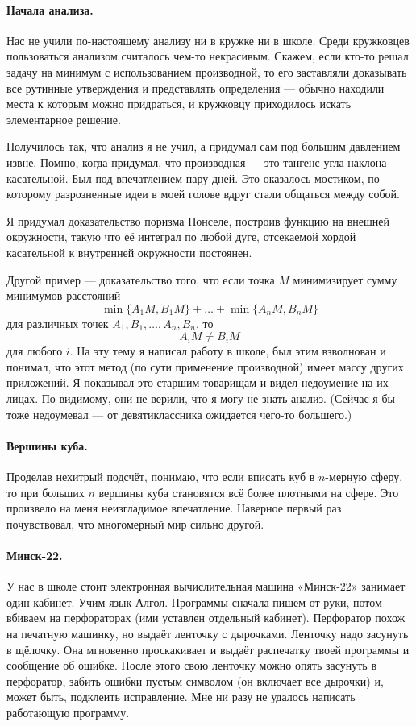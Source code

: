 \documentclass{book}
\begin{document}
\paragraph{Начала анализа.}
Нас не учили по-настоящему анализу ни в кружке ни в школе.
Среди кружковцев пользоваться анализом считалось чем-то некрасивым.
Скажем, если кто-то решал задачу на минимум с использованием производной, то его заставляли доказывать все рутинные утверждения и представлять определения ---
обычно находили места к которым можно придраться, и кружковцу приходилось искать элементарное решение.

Получилось так, что анализ я не учил,
а придумал сам под большим давлением извне.
Помню, когда придумал, что производная --- это тангенс угла наклона касательной.
Был под впечатлением пару дней.
Это оказалось мостиком, по которому разрозненные идеи в моей голове вдруг стали общаться между собой.

Я придумал доказательство поризма Понселе, построив функцию на внешней окружности, такую что её интеграл по любой дуге, отсекаемой хордой касательной к внутренней окружности постоянен.

Другой пример --- доказательство того,
что если точка $M$ минимизирует сумму минимумов расстояний
\[\min\{A_1M,B_1M\}+\dots+\min\{A_nM,B_nM\}\]
для различных точек $A_1,B_1,\dots,A_n,B_n$, 
то
\[A_iM\ne B_iM\]
для любого $i$.
На эту тему я написал работу в школе, 
был этим взволнован и понимал, 
что этот метод (по сути применение производной) имеет массу других приложений.
Я показывал это старшим товарищам и видел недоумение на их лицах.
По-видимому, они не верили, что я могу не знать анализ.
(Сейчас я бы тоже недоумевал --- от девятиклассника ожидается чего-то большего.)

\paragraph{Вершины куба.}
Проделав нехитрый подсчёт, понимаю, что если вписать куб в $n$-мерную сферу, то при больших $n$ вершины куба становятся всё более плотными на сфере.
Это произвело на меня неизгладимое впечатление. 
Наверное первый раз почувствовал, что многомерный мир сильно другой.

\paragraph{Минск-22.} 
У нас в школе стоит электронная вычислительная машина «Минск-22»
занимает один кабинет.
Учим язык Алгол.
Программы сначала пишем от руки, потом вбиваем на перфораторах (ими уставлен отдельный кабинет).
Перфоратор похож на печатную машинку, но выдаёт ленточку с дырочками.
Ленточку надо засунуть в щёлочку. 
Она мгновенно проскакивает и выдаёт распечатку твоей программы и сообщение об ошибке.
После этого свою ленточку можно опять засунуть в перфоратор, забить ошибки пустым символом (он включает все дырочки) и, может быть, подклеить исправление.
Мне ни разу не удалось написать работающую программу.
\end{document}
